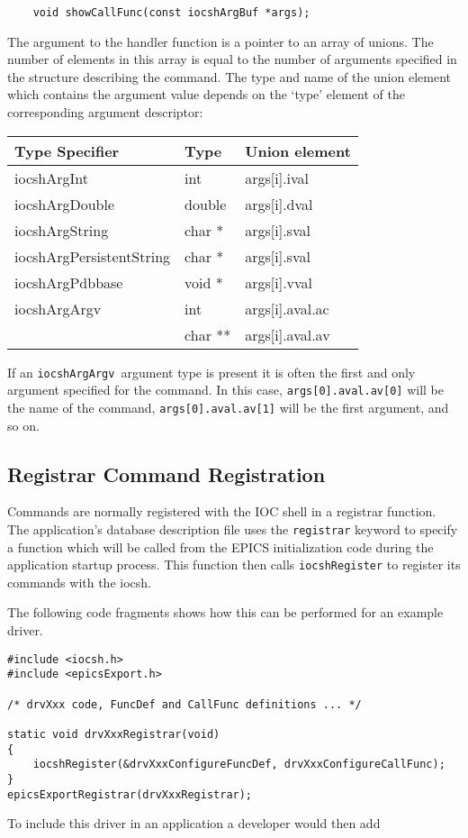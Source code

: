 \begin{verbatim}    void showCallFunc(const iocshArgBuf *args);
\end{verbatim}The argument to the handler function is a pointer to an array of unions.  The number of elements in this array is equal to 
the number of arguments specified in the structure describing the command.  The type and name of the union element 
which contains the argument value depends on the `type' element of the corresponding argument descriptor:
\begin{center}\begin{longtable}{p{1.45833in}p{0.56in}p{1.19in}}
Type Specifier & Type & Union element\\
\hline
iocshArgInt & int & args[i].ival\\
iocshArgDouble & double & args[i].dval\\
iocshArgString  & char * & args[i].sval\\
iocshArgPersistentString & char * & args[i].sval\\
iocshArgPdbbase & void * & args[i].vval\\
iocshArgArgv & int & args[i].aval.ac \\
 & char ** & args[i].aval.av
\end{longtable}\end{center}


If an \verb|iocshArgArgv |argument type is present it is often the first and only argument specified for the command.  In this 
case, \verb|args[0].aval.av[0]| will be the name of the command,  \verb|args[0].aval.av[1]| will be the first argument, 
and so on.

\subsection{Registrar Command Registration}

Commands are normally registered with the IOC shell in a registrar function. The application's database description file 
uses the \verb|registrar| keyword to specify a function which will be called from the EPICS initialization code during the 
application startup process.  This function then calls \verb|iocshRegister| to register its commands with the iocsh.

The following code fragments shows how this can be performed for an example driver.

\begin{verbatim}#include <iocsh.h>
#include <epicsExport.h>

/* drvXxx code, FuncDef and CallFunc definitions ... */

static void drvXxxRegistrar(void)
{
    iocshRegister(&drvXxxConfigureFuncDef, drvXxxConfigureCallFunc);
}
epicsExportRegistrar(drvXxxRegistrar);
\end{verbatim}To include this driver in an application a developer would then add

